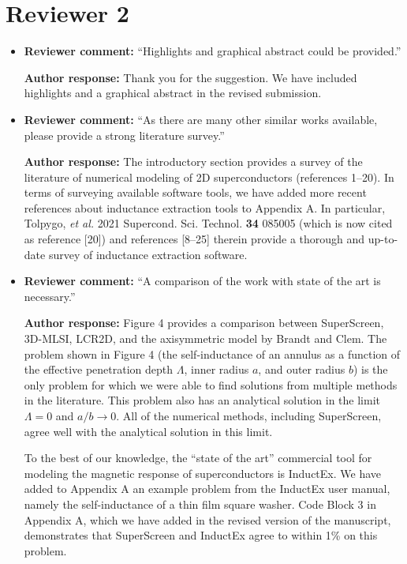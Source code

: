 \documentclass{article} %
\begin{document}
\section{Reviewer 2}
\begin{itemize}
    \item{
    {\bf Reviewer comment:} ``Highlights and graphical abstract could be provided.''
    
    {\bf Author response:} Thank you for the suggestion. We have included highlights and a graphical abstract in the revised submission.
    }
    \item{
    {\bf Reviewer comment:} ``As there are many other similar works available, please provide a strong literature survey.''
    
    {\bf Author response:} The introductory section provides a survey of the literature of numerical modeling of 2D superconductors (references 1--20). In terms of surveying available software tools, we have added more recent references about inductance extraction tools to Appendix A. In particular, Tolpygo, \emph{et al.} 2021 Supercond. Sci. Technol. {\bf 34} 085005 (which is now cited as reference [20]) and references [8--25] therein provide a thorough and up-to-date survey of inductance extraction software.
    }
    \item{
    {\bf Reviewer comment:} ``A comparison of the work with state of the art is necessary.''
    
    {\bf Author response:} Figure 4 provides a comparison between SuperScreen, 3D-MLSI, LCR2D, and the axisymmetric model by  Brandt and Clem. The problem shown in Figure 4 (the self-inductance of an annulus as a function of the effective penetration depth $\Lambda$, inner radius $a$, and outer radius $b$) is the only problem for which we were able to find solutions from multiple methods in the literature. This problem also has an analytical solution in the limit $\Lambda=0$ and $a/b\to 0$. All of the numerical methods, including SuperScreen, agree well with the analytical solution in this limit.
    
    To the best of our knowledge, the ``state of the art'' commercial tool for modeling the magnetic response of superconductors is InductEx. We have added to Appendix A an example problem from the InductEx user manual, namely the self-inductance of a thin film square washer. Code Block 3 in Appendix A, which we have added in the revised version of the manuscript, demonstrates that SuperScreen and InductEx agree to within 1\% on this problem.
    }
\end{itemize}
\end{document}
